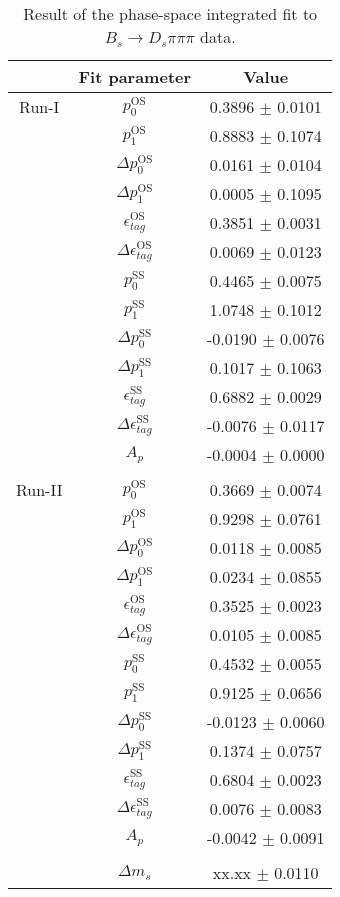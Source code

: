 \begin{table}[h]
\centering
\caption{Result of the phase-space integrated fit to $B_s \to D_s \pi \pi \pi$ data.}
\begin{tabular}{c c c}
\hline
\hline
& Fit parameter & Value \\
\hline
Run-I & $p_{0}^{\text{OS}}$ & 0.3896 $\pm$ 0.0101\\
&$p_{1}^{\text{OS}}$  & 0.8883 $\pm$ 0.1074\\
&$\Delta p_{0}^{\text{OS}}$  & 0.0161 $\pm$ 0.0104\\
&$\Delta p_{1}^{\text{OS}}$  & 0.0005 $\pm$ 0.1095\\
&$\epsilon_{tag}^{\text{OS}}$  & 0.3851 $\pm$ 0.0031\\
&$\Delta\epsilon_{tag}^{\text{OS}}$  & 0.0069 $\pm$ 0.0123\\
& $p_{0}^{\text{SS}}$ & 0.4465 $\pm$ 0.0075\\
&$p_{1}^{\text{SS}}$  & 1.0748 $\pm$ 0.1012\\
&$\Delta p_{0}^{\text{SS}}$  & -0.0190 $\pm$ 0.0076\\
&$\Delta p_{1}^{\text{SS}}$  & 0.1017 $\pm$ 0.1063\\
&$\epsilon_{tag}^{\text{SS}}$  & 0.6882 $\pm$ 0.0029\\
&$\Delta\epsilon_{tag}^{\text{SS}}$  & -0.0076 $\pm$ 0.0117\\
&$A_{p}$ & -0.0004 $\pm$ 0.0000\\
\\
Run-II & $p_{0}^{\text{OS}}$  & 0.3669 $\pm$ 0.0074\\
&$p_{1}^{\text{OS}}$  & 0.9298 $\pm$ 0.0761\\
&$\Delta p_{0}^{\text{OS}}$  & 0.0118 $\pm$ 0.0085\\
&$\Delta p_{1}^{\text{OS}}$  & 0.0234 $\pm$ 0.0855\\
&$\epsilon_{tag}^{\text{OS}}$  & 0.3525 $\pm$ 0.0023\\
&$\Delta\epsilon_{tag}^{\text{OS}}$  & 0.0105 $\pm$ 0.0085\\
& $p_{0}^{\text{SS}}$  & 0.4532 $\pm$ 0.0055\\
&$p_{1}^{\text{SS}}$  & 0.9125 $\pm$ 0.0656\\
&$\Delta p_{0}^{\text{SS}}$  & -0.0123 $\pm$ 0.0060\\
&$\Delta p_{1}^{\text{SS}}$  & 0.1374 $\pm$ 0.0757\\
&$\epsilon_{tag}^{\text{SS}}$  & 0.6804 $\pm$ 0.0023\\
&$\Delta\epsilon_{tag}^{\text{SS}}$  & 0.0076 $\pm$ 0.0083\\
&$A_{p}$ & -0.0042 $\pm$ 0.0091\\
\\
&$\Delta m_{s}$ &  xx.xx  $\pm$ 0.0110\\
\hline
\hline
\end{tabular}
\label{table:timeFit_norm}
\end{table}